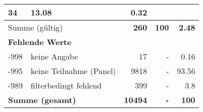 \begin{longtable}{lXrrr}
       \num{34} &
       \num[round-mode=places,round-precision=2]{13,08} &
         \num[round-mode=places,round-precision=2]{0,32} \\
     \midrule
     \multicolumn{2}{l}{Summe (gültig)} &
       \textbf{\num{260}} &
     \textbf{100} &
       \textbf{\num[round-mode=places,round-precision=2]{2,48}} \\
     \multicolumn{5}{l}{\textbf{Fehlende Werte}}\\
       -998 &
       keine Angabe &
         \num{17} &
        - &
         \num[round-mode=places,round-precision=2]{0,16} \\
       -995 &
       keine Teilnahme (Panel) &
         \num{9818} &
        - &
         \num[round-mode=places,round-precision=2]{93,56} \\
       -989 &
       filterbedingt fehlend &
         \num{399} &
        - &
         \num[round-mode=places,round-precision=2]{3,8} \\
     \midrule
     \multicolumn{2}{l}{\textbf{Summe (gesamt)}} &
          \textbf{\num{10494}} &
        \textbf{-} &
        \textbf{100} \\
     \bottomrule
     \end{longtable}
     
